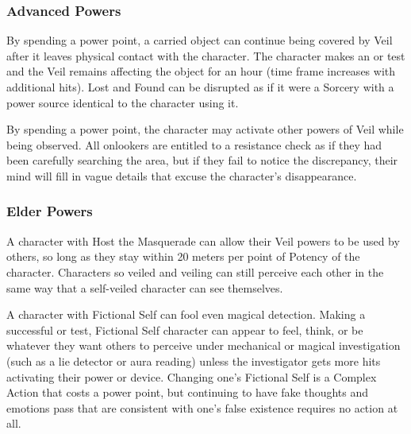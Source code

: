 \subsubsection{Advanced Powers}

 By spending a power point, a carried object can continue being covered by Veil after it leaves physical contact with the character. The character makes an  or  test and the Veil remains affecting the object for an hour (time frame increases with additional hits). Lost and Found can be disrupted as if it were a Sorcery with a power source identical to the character using it.

 By spending a power point, the character may activate other powers of Veil while being observed. All onlookers are entitled to a resistance check as if they had been carefully searching the area, but if they fail to notice the discrepancy, their mind will fill in vague details that excuse the character's disappearance.


\subsubsection{Elder Powers}

 A character with Host the Masquerade can allow their Veil powers to be used by others, so long as they stay within 20 meters per point of Potency of the character. Characters so veiled and veiling can still perceive each other in the same way that a self-veiled character can see themselves.

 A character with Fictional Self can fool even magical detection. Making a successful  or  test,  Fictional Self character can appear to feel, think, or be whatever they want others to perceive under mechanical or magical investigation (such as a lie detector or aura reading) unless the investigator gets more hits activating their power or device. Changing one's Fictional Self is a Complex Action that costs a power point, but continuing to have fake thoughts and emotions pass that are consistent with one's false existence requires no action at all.


